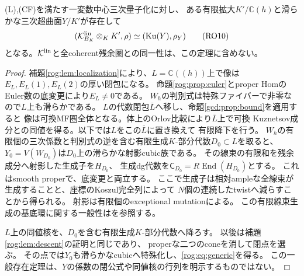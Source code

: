 \begin{theorem}[一変数量子化の幾何学的一般点]\label{rog:thm:geometric-generic}
\textup{(L),(CF)}を満たす一変数中心三次量子化に対し、
ある有限拡大$K'/\mathbb C(h)$と滑らかな三次超曲面$Y/K'$が存在して
\[
 (\mathcal K^{\rm lin}_{B_K}\otimes_KK',\rho)
 \simeq(\operatorname{Ku}(Y),\rho_Y)
 \tag{RO10}\label{rog:eq:generic}
\]
となる。$\mathcal K^{\rm lin}$と全coherent残余圏との同一性は、この定理に含めない。
\end{theorem}
\begin{proof}
補題\ref{rog:lem:localization}により、$L=\mathbb C((h))$上で像は
$E_L,E_L(1),E_L(2)$の厚い閉包になる。
命題\ref{rog:prop:euler}とproper HomのEuler数の底変更により$E_L\ne0$である。
$W_h$の判別式は特殊ファイバーで非零なので$L$上も滑らかである。
$L$の代数閉包$\overline L$へ移し、命題\ref{gcd:prop:bound}を適用すると
像は可換MF圏全体となる。体上のOrlov比較により$\overline L$上で可換
Kuznetsov成分との同値を得る。以下では$L$をこの$\overline L$に置き換えて
有限降下を行う。
$W_h$の有限個の三次係数と判別式の逆を含む有限生成$K$-部分代数$D_0\subset L$を取ると、
$Y_0=V(W_{D_0})$は$D_0$上の滑らかな射影cubic族である。
その線束の有限和を残余成分へ射影した生成子を$H_{D_0}$、
生成dg代数を$\mathsf C_{D_0}=R\operatorname{End}(H_{D_0})$とする。
これはsmooth properで、底変更と両立する。
ここで生成子は相対ampleな全線束が生成することと、座標のKoszul完全列によって
$N$個の連続したtwistへ減らすことから得られる。
射影は有限個のexceptional mutationによる。
この有限線束生成の基底環に関する一般性は\cite[\S36.16]{ROGStacks}を参照する。

$L$上の同値核を、$D_0$を含む有限生成$K$-部分代数へ降ろす。
以後は補題\ref{rog:lem:descent}の証明と同じであり、
properな二つのconeを消して閉点を選ぶ。
その点では$Y_0$も滑らかなcubicへ特殊化し、\eqref{rog:eq:generic}を得る。
この一般存在定理は、$Y$の係数の閉公式や同値核の行列を明示するものではない。
\end{proof}


